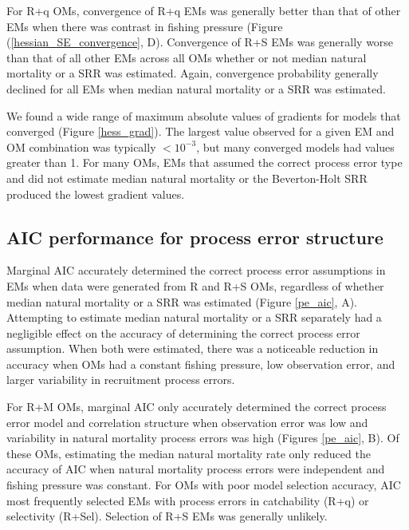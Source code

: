 \documentclass[
  12pt,
]{article}
\begin{document}
For R+q OMs, convergence of R+q EMs was generally better than that of
other EMs when there was contrast in fishing pressure (Figure
(\ref{hessian_SE_convergence}, D). Convergence of R+S EMs was generally
worse than that of all other EMs across all OMs whether or not median
natural mortality or a SRR was estimated. Again, convergence probability
generally declined for all EMs when median natural mortality or a SRR
was estimated.

We found a wide range of maximum absolute values of gradients for models
that converged (Figure \ref{hess_grad}). The largest value observed for
a given EM and OM combination was typically \(<10^{-3}\), but many
converged models had values greater than 1. For many OMs, EMs that
assumed the correct process error type and did not estimate median
natural mortality or the Beverton-Holt SRR produced the lowest gradient
values.

\hypertarget{aic-performance-for-process-error-structure}{%
\subsection*{AIC performance for process error
structure}\label{aic-performance-for-process-error-structure}}

Marginal AIC accurately determined the correct process error assumptions
in EMs when data were generated from R and R+S OMs, regardless of
whether median natural mortality or a SRR was estimated (Figure
\ref{pe_aic}, A). Attempting to estimate median natural mortality or a
SRR separately had a negligible effect on the accuracy of determining
the correct process error assumption. When both were estimated, there
was a noticeable reduction in accuracy when OMs had a constant fishing
pressure, low observation error, and larger variability in recruitment
process errors.

For R+M OMs, marginal AIC only accurately determined the correct process
error model and correlation structure when observation error was low and
variability in natural mortality process errors was high (Figures
\ref{pe_aic}, B). Of these OMs, estimating the median natural mortality
rate only reduced the accuracy of AIC when natural mortality process
errors were independent and fishing pressure was constant. For OMs with
poor model selection accuracy, AIC most frequently selected EMs with
process errors in catchability (R+q) or selectivity (R+Sel). Selection
of R+S EMs was generally unlikely.
\end{document}
